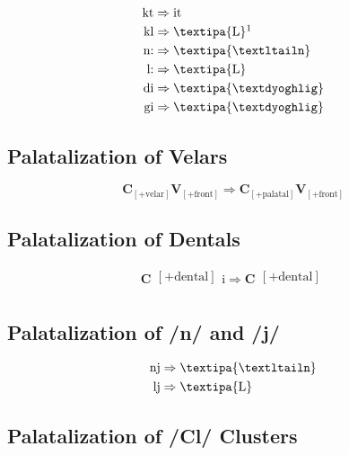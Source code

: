 \documentclass{report}
\begin{document}
\begin{align}
  \text{kt} & \Rightarrow \text{it} \\
  \text{kl} & \Rightarrow \text{\textipa{L}}\footnotemark \\
  \text{n:} & \Rightarrow \text{\textipa{\textltailn}} \\
  \text{l:} & \Rightarrow \text{\textipa{L}} \\
  \text{di} & \Rightarrow \text{\textipa{\textdyoghlig}} \\
  \text{gi} & \Rightarrow \text{\textipa{\textdyoghlig}}
\end{align}

\subsection{Palatalization of Velars}

\begin{equation}
  \textbf{C}_{[+\text{velar}]}\textbf{V}_{[+\text{front}]} \Rightarrow \textbf{C}_{[+\text{palatal}]}\textbf{V}_{[+\text{front}]}
\end{equation}


\subsection{Palatalization of Dentals}

\begin{equation}
  \textbf{C}\substack{[+\text{dental}] \\ [+\text{stop}]}\text{i} \Rightarrow \textbf{C}\substack{[+\text{dental}] \\ [+\text{affricate}]}
\end{equation}

\subsection{Palatalization of /n/ and /j/}

\begin{align}
  \text{nj} & \Rightarrow \text{\textipa{\textltailn}} \\
  \text{lj} & \Rightarrow \text{\textipa{L}}
\end{align}

\subsection{Palatalization of /Cl/ Clusters}
\end{document}
